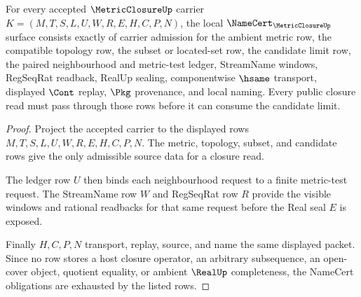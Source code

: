 \begin{theorem}
\label{thm:metric-closure-namecert-obligations}
For every accepted $\MetricClosureUp$ carrier $K=(M,T,S,L,U,W,R,E,H,C,P,N)$, the local $\NameCert_{\MetricClosureUp}$ surface consists exactly of carrier admission for the ambient metric row, the compatible topology row, the subset or located-set row, the candidate limit row, the paired neighbourhood and metric-test ledger, StreamName windows, RegSeqRat readback, RealUp sealing, componentwise $\hsame$ transport, displayed $\Cont$ replay, $\Pkg$ provenance, and local naming. Every public closure read must pass through those rows before it can consume the candidate limit.
\end{theorem}
\begin{proof}
Project the accepted carrier to the displayed rows $M,T,S,L,U,W,R,E,H,C,P,N$. The metric, topology, subset, and candidate rows give the only admissible source data for a closure read.

The ledger row $U$ then binds each neighbourhood request to a finite metric-test request. The StreamName row $W$ and RegSeqRat row $R$ provide the visible windows and rational readbacks for that same request before the Real seal $E$ is exposed.

Finally $H,C,P,N$ transport, replay, source, and name the same displayed packet. Since no row stores a host closure operator, an arbitrary subsequence, an open-cover object, quotient equality, or ambient $\RealUp$ completeness, the NameCert obligations are exhausted by the listed rows.
\end{proof}

